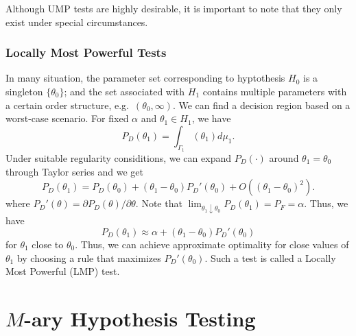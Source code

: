 Although UMP tests are highly desirable, it is important to note that they only exist under special circumstances.

\subsubsection{Locally  Most Powerful Tests}

In many situation, the parameter set corresponding to hyptothesis $H_0$ is a singleton $\{ \theta_0 \}$; and the set associated with $H_1$ contains multiple parameters with a certain order structure, e.g.~$( \theta_0, \infty)$.
We can find a decision region based on a worst-case scenario.
For fixed $\alpha$ and $\theta_1 \in H_1$, we have
\begin{equation*}
P_D (\theta_1) = \int_{\Gamma_1} (\theta_1) d \mu_1 .
\end{equation*}
Under suitable regularity considitions, we can expand $P_D (\cdot)$ around $\theta_1 = \theta_0$ through Taylor series and we get
\begin{equation*}
P_D (\theta_1) = P_D (\theta_0) + ( \theta_1 - \theta_0 ) P_D' (\theta_0) + O \left( (\theta_1 - \theta_0)^2 \right) .
\end{equation*}
where $P_D' (\theta) = \partial P_D (\theta) / \partial \theta$.
Note that $\lim_{\theta_1 \downarrow \theta_0} P_D (\theta_1) = P_F = \alpha$.
Thus, we have
\begin{equation*}
P_D (\theta_1) \approx \alpha + ( \theta_1 - \theta_0 ) P_D' (\theta_0)
\end{equation*}
for $\theta_1$ close to $\theta_0$.
Thus, we can achieve approximate optimality for close values of $\theta_1$ by choosing a rule that maximizes $P_D' (\theta_0)$.
Such a test is called a Locally Most Powerful (LMP) test.
\newpage



\section{$M$-ary Hypothesis Testing}

